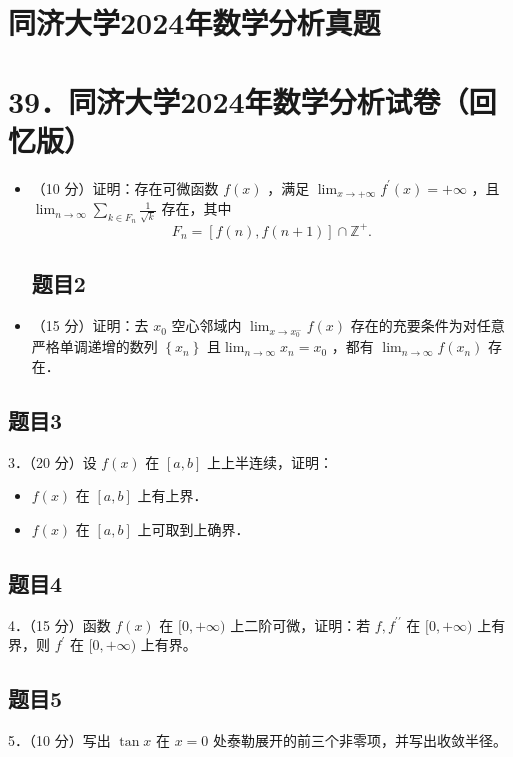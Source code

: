 \documentclass{article}
\begin{document}
\section*{同济大学2024年数学分析真题}
\section*{39．同济大学2024年数学分析试卷（回忆版）}
\begin{itemize}

\subsection{题目1}
  \item[1．] （10 分）证明：存在可微函数 \(f(x)\) ，满足 \(\lim _{x \rightarrow+\infty} f^{\prime}(x)=+\infty\) ，且 \(\lim _{n \rightarrow \infty} \sum_{k \in F_{n}} \frac{1}{\sqrt{k}}\) 存在，其中
\[
F_{n}=[f(n), f(n+1)] \cap \mathbb{Z}^{+} .
\]

\subsection{题目2}
  \item[2．] （15 分）证明：去 \(x_{0}\) 空心邻域内 \(\lim _{x \rightarrow x_{0}^{-}} f(x)\) 存在的充要条件为对任意严格单调递增的数列 \(\left\{x_{n}\right\}\) 且\(\lim _{n \rightarrow \infty} x_{n}=x_{0}\) ，都有 \(\lim _{n \rightarrow \infty} f\left(x_{n}\right)\) 存在．
\end{itemize}

\subsection{题目3}
3．（20 分）设 \(f(x)\) 在 \([a, b]\) 上上半连续，证明：

\begin{itemize}
  \item[（1）] \(f(x)\) 在 \([a, b]\) 上有上界．
  \item[（2）] \(f(x)\) 在 \([a, b]\) 上可取到上确界．
\end{itemize}

\subsection{题目4}
4．（15 分）函数 \(f(x)\) 在 \([0,+\infty)\) 上二阶可微，证明：若 \(f, f^{\prime \prime}\) 在 \([0,+\infty)\) 上有界，则 \(f^{\prime}\) 在 \([0,+\infty)\) 上有界。

\subsection{题目5}
5．（10 分）写出 \(\tan x\) 在 \(x=0\) 处泰勒展开的前三个非零项，并写出收敛半径。
\end{document}
